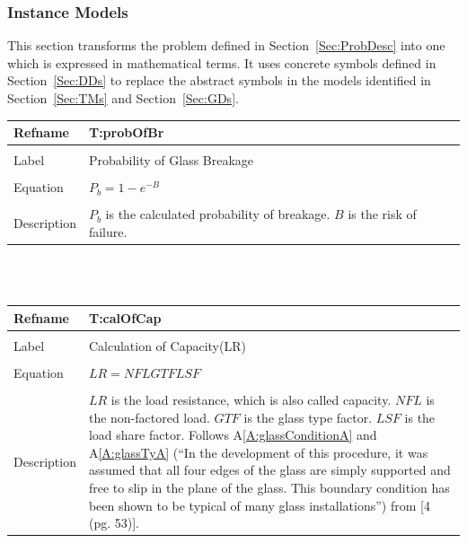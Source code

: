 \documentclass[12pt]{article}
\begin{document}
\subsubsection{Instance Models}
\label{Sec:IMs}
This section transforms the problem defined in Section~\ref{Sec:ProbDesc} into one which is expressed in mathematical terms. It uses concrete symbols defined in Section~\ref{Sec:DDs} to replace the abstract symbols in the models identified in Section~\ref{Sec:TMs} and Section~\ref{Sec:GDs}.
~\newline
\noindent \begin{minipage}{\textwidth}
\begin{tabular}{p{} p{}}
\toprule \textbf{Refname} & \textbf{T:probOfBr}
\label{T:probOfBr}
\\ \midrule \\
Label & Probability of Glass Breakage
\\ \midrule \\
Equation & ${P_{b}}=1-e^{-B}$
\\ \midrule \\
Description & ${P_{b}}$ is the calculated probability of breakage. $B$ is the risk of failure.
\\ \bottomrule \end{tabular}
\end{minipage}\\
~\newline
\noindent \begin{minipage}{\textwidth}
\begin{tabular}{p{} p{}}
\toprule \textbf{Refname} & \textbf{T:calOfCap}
\label{T:calOfCap}
\\ \midrule \\
Label & Calculation of Capacity(LR)
\\ \midrule \\
Equation & $LR=NFL GTF LSF$
\\ \midrule \\
Description & $LR$ is the load resistance, which is also called capacity. $NFL$ is the non-factored load. $GTF$ is the glass type factor. $LSF$ is the load share factor. Follows A\ref{A:glassConditionA} and A\ref{A:glassTyA} (``In the development of this procedure, it was assumed that all four edges of the glass are simply supported and free to slip in the plane of the glass. This boundary condition has been shown to be typical of many glass installations'') from [4 (pg. 53)].
\\ \bottomrule \end{tabular}
\end{minipage}\\
\end{document}
